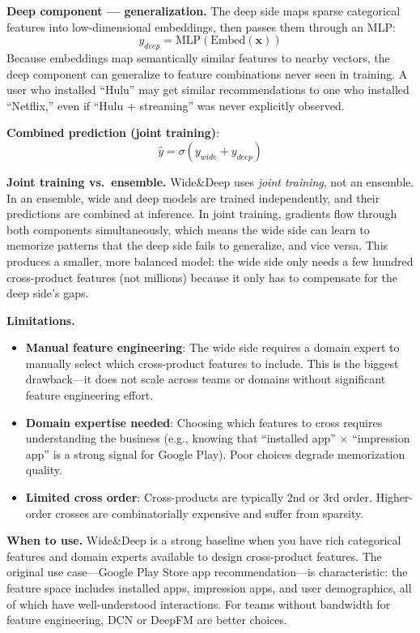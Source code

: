 \textbf{Deep component --- generalization.} The deep side maps sparse categorical features into low-dimensional embeddings, then passes them through an MLP:
\begin{equation}
y_{deep} = \text{MLP}(\text{Embed}(\mathbf{x}))
\end{equation}
Because embeddings map semantically similar features to nearby vectors, the deep component can generalize to feature combinations never seen in training. A user who installed ``Hulu'' may get similar recommendations to one who installed ``Netflix,'' even if ``Hulu + streaming'' was never explicitly observed.

\textbf{Combined prediction (joint training)}:
\begin{equation}
\hat{y} = \sigma(y_{wide} + y_{deep})
\end{equation}

\textbf{Joint training vs.\ ensemble.} Wide\&Deep uses \textit{joint training}, not an ensemble. In an ensemble, wide and deep models are trained independently, and their predictions are combined at inference. In joint training, gradients flow through both components simultaneously, which means the wide side can learn to memorize patterns that the deep side fails to generalize, and vice versa. This produces a smaller, more balanced model: the wide side only needs a few hundred cross-product features (not millions) because it only has to compensate for the deep side's gaps.

\textbf{Limitations.}
\begin{itemize}
    \item \textbf{Manual feature engineering}: The wide side requires a domain expert to manually select which cross-product features to include. This is the biggest drawback---it does not scale across teams or domains without significant feature engineering effort.
    \item \textbf{Domain expertise needed}: Choosing which features to cross requires understanding the business (e.g., knowing that ``installed app'' $\times$ ``impression app'' is a strong signal for Google Play). Poor choices degrade memorization quality.
    \item \textbf{Limited cross order}: Cross-products are typically 2nd or 3rd order. Higher-order crosses are combinatorially expensive and suffer from sparsity.
\end{itemize}

\textbf{When to use.} Wide\&Deep is a strong baseline when you have rich categorical features and domain experts available to design cross-product features. The original use case---Google Play Store app recommendation---is characteristic: the feature space includes installed apps, impression apps, and user demographics, all of which have well-understood interactions. For teams without bandwidth for feature engineering, DCN or DeepFM are better choices.

